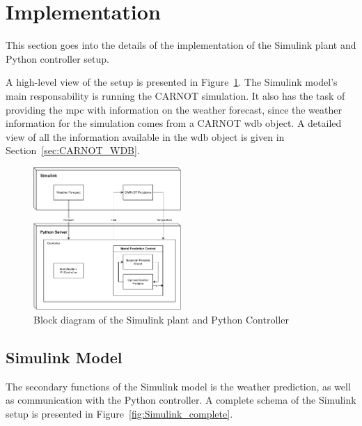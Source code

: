 \section{Implementation}\label{sec:implementation}

This section goes into the details of the implementation of the Simulink plant
and Python controller setup.

A high-level view of the setup is presented in Figure~\ref{fig:setup_diagram}.
The Simulink model's main responsability is running the CARNOT simulation. It
also has the task of providing the \acrshort{mpc} with information on the
weather forecast, since the weather information for the simulation comes from a
CARNOT \acrshort{wdb} object. A detailed view of all the information available
in the \acrshort{wdb} object is given in Section~\ref{sec:CARNOT_WDB}.


\begin{figure}[ht]
    \centering
    \includegraphics[width = 0.5\textwidth]{Images/setup_diagram.pdf}
    \caption{Block diagram of the Simulink plant and Python Controller}
    \label{fig:setup_diagram}
\end{figure}

\subsection{Simulink Model}

The secondary functions of the Simulink model is the weather prediction, as well
as communication with the Python controller. A complete schema of the Simulink
setup is presented in Figure~\ref{fig:Simulink_complete}.

